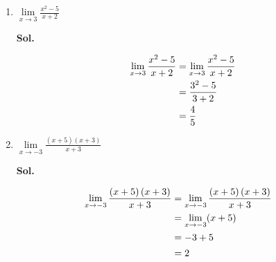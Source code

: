\documentclass{report}
\newcommand{\sol}[1]{

      \noindent \textbf{Sol.}
}
\def\eos{\quad\hbox{\rlap{\hbox{\vrule depth 1.5pt height 2.6mm width 0.2mm \hskip 1mm \vrule height 2.6mm width 0.2mm}}{\vbox{\hrule height 0.2mm width 1.4mm \vskip 2.8mm \hrule depth 1.5pt height -0.35mm width 1.2mm}}}}
\begin{document}
\begin{multicols*}{2}
\begin{enumerate}
            \item $\lim\limits_{x\to3}{\frac{x^{2}-5}{x+2}}$
                  \sol{}
                  \begin{align*}
                        \lim_{x \to 3}{\frac{x^{2}-5}{x+2}} & = \lim_{x \to 3}\frac{x^{2}-5}{x+2} \\
                                                            & = \frac{3^{2}-5}{3+2}               \\
                                                            & = \frac{4}{5}\eos
                  \end{align*}

            \item $\lim\limits_{x\to-3}{\frac{(x+5)\left(x+3\right)}{x+3}}$
                  \sol{}
                  \begin{align*}
                        \lim_{x \to -3}{\frac{(x+5)\left(x+3\right)}{x+3}} & = \lim_{x \to -3}\frac{(x+5)\left(x+3\right)}{x+3} & \\
                                                                           & = \lim_{x \to -3}(x+5)                               \\
                                                                           & = -3+5                                               \\
                                                                           & = 2\eos
                  \end{align*}


\end{enumerate}
\end{multicols*}
\end{document}
